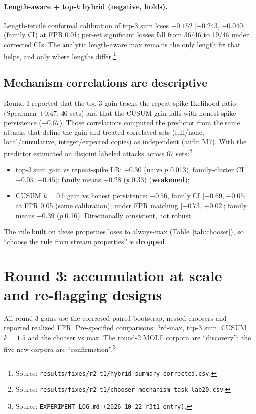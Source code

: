 \documentclass[11pt]{article}
\newcommand{\m}{\ensuremath{-}}
\newcommand{\src}[1]{\footnote{Source: \nolinkurl{#1}.}}
\newcommand{\vweak}{\textcolor{BurntOrange}{\textbf{weakened}}}
\newcommand{\vdrop}{\textcolor{BrickRed}{\textbf{dropped}}}
\begin{document}
\paragraph{Length-aware + top-$k$ hybrid (negative, holds).} Length-tercile conformal calibration of top-3 sum loses $\m0.152$ [$\m0.243$, $\m0.040$] (family CI) at FPR 0.01; per-set significant losses fall from 36/46 to 19/46 under corrected CIs. The analytic length-aware max remains the only length fix that helps, and only where lengths differ.\src{results/fixes/r2_t1/hybrid_summary_corrected.csv}

\subsection{Mechanism correlations are descriptive}\label{sec:mech}
Round 1 reported that the top-3 gain tracks the repeat-spike likelihood ratio (Spearman $+0.47$, 46 sets) and that the CUSUM gain falls with honest spike persistence ($\m0.67$). Those correlations computed the predictor from the same attacks that define the gain and treated correlated sets (full/none, local/cumulative, integer/expected copies) as independent (audit M7). With the predictor estimated on disjoint labeled attacks across 67 sets:\src{results/fixes/r2_t1/chooser_mechanism_task_lab20.csv}
\begin{itemize}
\item top-3 sum gain vs repeat-spike LR: $+0.30$ (naive $p$ 0.013), family-cluster CI [$\m0.03$, $+0.45$]; family means $+0.28$ ($p$ 0.33) (\vweak);
\item CUSUM $k{=}0.5$ gain vs honest persistence: $\m0.56$, family CI [$\m0.69$, $\m0.05$] at FPR 0.05 (same calibration); under FPR matching [$\m0.73$, $+0.02$]; family means $\m0.39$ ($p$ 0.16). Directionally consistent, not robust.
\end{itemize}
The rule built on these properties loses to always-max (Table~\ref{tab:chooser}), so ``choose the rule from stream properties'' is \vdrop.

\section{Round 3: accumulation at scale and re-flagging designs}

All round-3 gains use the corrected paired bootstrap, nested choosers and reported realized FPR. Pre-specified comparisons: 3rd-max, top-3 sum, CUSUM $k{=}1.5$ and the chooser vs max. The round-2 MOLE corpora are ``discovery''; the five new corpora are ``confirmation''.\src{EXPERIMENT_LOG.md (2026-10-22 r3t1 entry)}
\end{document}
